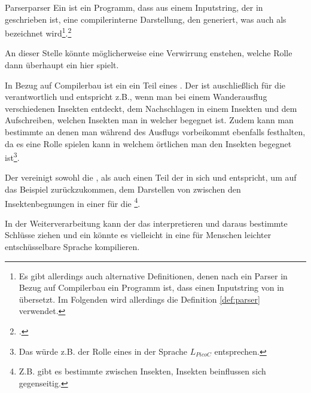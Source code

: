 \begin{Definition}{Parser}{parser}
  Ein  ist ein Programm, dass aus einem Inputstring, der in  geschrieben ist, eine compilerinterne Darstellung, den  generiert, was auch als   bezeichnet wird\footnote{Es gibt allerdings auch alternative Definitionen, denen nach ein Parser in Bezug auf Compilerbau ein Programm ist, dass einen Inputstring von  in   übersetzt. Im Folgenden wird allerdings die Definition \ref{def:parser} verwendet.}.\footcite{noauthor_json_nodate}
\end{Definition}

\begin{Special_Paragraph}
  An dieser Stelle könnte möglicherweise eine Verwirrung enstehen, welche Rolle dann überhaupt ein  hier spielt.

  In Bezug auf Compilerbau ist ein  ein Teil eines . Der  ist auschließlich für die  verantwortlich und entspricht z.B., wenn man bei einem Wanderausflug verschiedenen Insekten entdeckt, dem Nachschlagen in einem Insekten und dem Aufschreiben, welchen Insekten man in welcher  begegnet ist. Zudem kann man bestimmte  an denen man während des Ausflugs vorbeikommt ebenfalls festhalten, da es eine Rolle spielen kann in welchem örtlichen  man den Insekten begegnet ist\footnote{Das würde z.B. der Rolle eines  \smalltt{;} in der Sprache $L_{PicoC}$ entsprechen.}.

  Der  vereinigt sowohl die , als auch einen Teil der  in sich und entspricht, um auf das Beispiel zurückzukommen, dem Darstellen von  zwischen den Insektenbegnungen in einer für die \footnote{Z.B. gibt es bestimmte  zwischen Insekten, Insekten beinflussen sich gegenseitig.}.

  In der Weiterverarbeitung kann der  das interpretieren und daraus bestimmte Schlüsse ziehen und ein   könnte es vielleicht in eine für Menschen leichter entschüsselbare Sprache kompilieren.
\end{Special_Paragraph}

